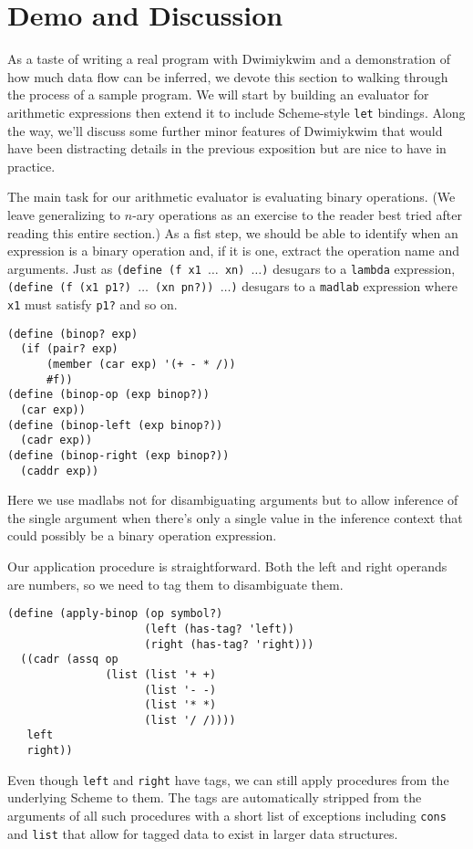 \documentclass[11pt]{article}
\begin{document}
\section{Demo and Discussion}

As a taste of writing a real program with Dwimiykwim
and a demonstration of how much data flow can be inferred,
we devote this section to walking through the process of a sample program.
We will start by building an evaluator for arithmetic expressions
then extend it to include Scheme-style \texttt{let} bindings.
Along the way, we'll discuss some further minor features of Dwimiykwim
that would have been distracting details in the previous exposition
but are nice to have in practice.

The main task for our arithmetic evaluator is evaluating binary operations.
(We leave generalizing to $n$-ary operations as an exercise to the reader
best tried after reading this entire section.)
As a fist step, we should be able to identify
when an expression is a binary operation
and, if it is one, extract the operation name and arguments.
Just as \texttt{(define (f x1 $\dots$ xn) $\dots$)}
desugars to a \texttt{lambda} expression,
\texttt{(define (f (x1 p1?) $\dots$ (xn pn?)) $\dots$)}
desugars to a \texttt{madlab} expression
where \texttt{x1} must satisfy \texttt{p1?} and so on.
\begin{Verbatim}
(define (binop? exp)
  (if (pair? exp)
      (member (car exp) '(+ - * /))
      #f))
(define (binop-op (exp binop?))
  (car exp))
(define (binop-left (exp binop?))
  (cadr exp))
(define (binop-right (exp binop?))
  (caddr exp))
\end{Verbatim}
Here we use madlabs not for disambiguating arguments
but to allow inference of the single argument
when there's only a single value in the inference context
that could possibly be a binary operation expression.

Our application procedure is straightforward.
Both the left and right operands are numbers,
so we need to tag them to disambiguate them.
\begin{Verbatim}
(define (apply-binop (op symbol?)
                     (left (has-tag? 'left))
                     (right (has-tag? 'right)))
  ((cadr (assq op
               (list (list '+ +)
                     (list '- -)
                     (list '* *)
                     (list '/ /))))
   left
   right))
\end{Verbatim}
Even though \texttt{left} and \texttt{right} have tags,
we can still apply procedures from the underlying Scheme to them.
The tags are automatically stripped from the arguments of all such procedures
with a short list of exceptions including \texttt{cons} and \texttt{list}
that allow for tagged data to exist in larger data structures.
\end{document}
